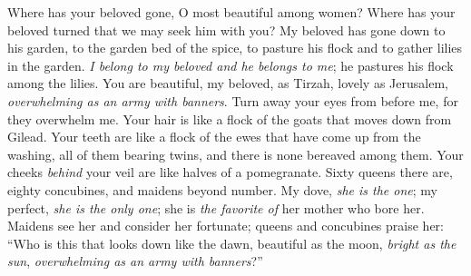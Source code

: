 \begin{biblechapter} %
\verse Where has your beloved gone, 
O most beautiful among women? 
Where has your beloved turned 
that we may seek him with you?
\verse My beloved has gone down to his garden, 
to the garden bed of the spice, 
to pasture his flock and to gather lilies in the garden.
 \textit{I belong to my beloved and he belongs to me}; 
he pastures his flock among the lilies.
 You are beautiful, my beloved, as Tirzah, 
lovely as Jerusalem, 
\textit{overwhelming as an army with banners}.
\verse Turn away your eyes from before me, 
for they overwhelm me. 
Your hair is like a flock of the goats 
that moves down from Gilead.
\verse Your teeth are like a flock of the ewes 
that have come up from the washing, 
all of them bearing twins, 
and there is none bereaved among them.
\verse Your cheeks \textit{behind} your veil 
are like halves of a pomegranate.
 Sixty queens there are, eighty concubines, 
and maidens beyond number.
\verse My dove, \textit{she is the one}; 
my perfect, \textit{she is the only one}; 
she is \textit{the favorite of} her mother who bore her. 
Maidens see her and consider her fortunate; 
queens and concubines praise her:
\verse “Who is this that looks down like the dawn, 
beautiful as the moon, 
\textit{bright as the sun}, 
\textit{overwhelming as an army with banners}?”

\end{biblechapter}
